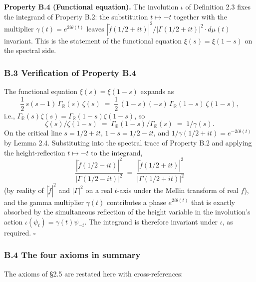 \documentclass[
  letterpaper,
  11pt]{article}
\theoremstyle{plain}
\theoremstyle{definition}
\theoremstyle{remark}
\begin{document}
\textbf{Property B.4 (Functional equation).} The involution \(\iota\) of Definition 2.3 fixes the integrand of Property B.2: the substitution \(t \mapsto -t\) together with the multiplier \(\gamma(t) = e^{2i\theta(t)}\) leaves \(|\tilde f(1/2 + it)|^2/|\Gamma(1/2 + it)|^2 \cdot d\mu(t)\) invariant. This is the statement of the functional equation \(\xi(s) = \xi(1-s)\) on the spectral side.

\subsubsection{B.3 Verification of Property B.4}\label{b.3-verification-of-property-b.4}

The functional equation \(\xi(s) = \xi(1-s)\) expands as
\[\frac{1}{2}\,s(s-1)\,\Gamma_{\mathbb{R}}(s)\,\zeta(s) \;=\; \frac{1}{2}\,(1-s)(-s)\,\Gamma_{\mathbb{R}}(1-s)\,\zeta(1-s),\]
i.e., \(\Gamma_{\mathbb{R}}(s)\zeta(s) = \Gamma_{\mathbb{R}}(1-s)\zeta(1-s)\), so
\[\zeta(s)/\zeta(1-s) \;=\; \Gamma_{\mathbb{R}}(1-s)/\Gamma_{\mathbb{R}}(s) \;=\; 1/\gamma(s).\]
On the critical line \(s = 1/2 + it\), \(1-s = 1/2 - it\), and \(1/\gamma(1/2 + it) = e^{-2i\theta(t)}\) by Lemma 2.4. Substituting into the spectral trace of Property B.2 and applying the height-reflection \(t \mapsto -t\) to the integrand,
\[\frac{|\tilde f(1/2 - it)|^2}{|\Gamma(1/2 - it)|^2} \;=\; \frac{|\tilde f(1/2 + it)|^2}{|\Gamma(1/2 + it)|^2}\]
(by reality of \(|\tilde f|^2\) and \(|\Gamma|^2\) on a real \(t\)-axis under the Mellin transform of real \(f\)), and the gamma multiplier \(\gamma(t)\) contributes a phase \(e^{2i\theta(t)}\) that is exactly absorbed by the simultaneous reflection of the height variable in the involution's action \(\iota(\psi_t) = \gamma(t)\psi_{-t}\). The integrand is therefore invariant under \(\iota\), as required. \(\square\)

\subsubsection{B.4 The four axioms in summary}\label{b.4-the-four-axioms-in-summary}

The axioms of §2.5 are restated here with cross-references:
\end{document}
